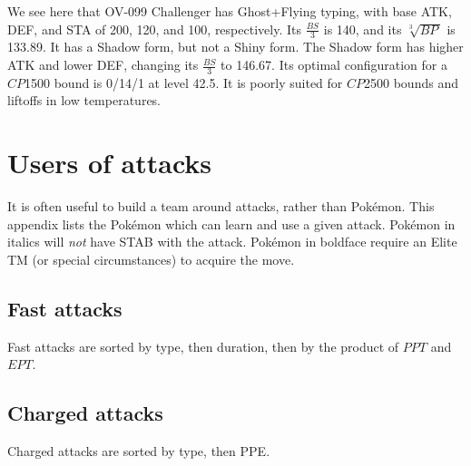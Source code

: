 \documentclass[ebook,10pt,openany,oneside]{memoir}
\newcommand*{\EPT}{\mbox{$\mathit{EPT}$}}
\newcommand*{\PPT}{\mbox{$\mathit{PPT}$}}
\newcommand*{\CP}{\mbox{$\mathit{CP}$}}
\newcommand*{\BP}{\mbox{$\mathit{BP}$}}
\begin{document}
\bigskip\noindent{}We see here that OV-099 Challenger has Ghost+Flying typing, with base ATK, DEF, and STA
of 200, 120, and 100, respectively. Its $\frac{BS}{3}$ is 140, and its $\sqrt[3]{\BP\,}$ is 133.89.
It has a Shadow form, but not a Shiny form. The Shadow form has higher ATK and lower DEF, changing
its $\frac{BS}{3}$ to 146.67. Its optimal configuration for a \CP1500 bound is 0/14/1 at level 42.5.
It is poorly suited for \CP2500 bounds and liftoffs in low temperatures.
\clearpage


\chapter{Users of attacks\label{chap:attackemployers}}
It is often useful to build a team around attacks, rather than Pokémon.
This appendix lists the Pokémon which can learn and use a given attack.
Pokémon in italics will \textit{not} have STAB with the attack.
Pokémon in boldface require an Elite TM (or special circumstances) to acquire the move.
\section{Fast attacks\label{sec:usersfast}}
Fast attacks are sorted by type, then duration, then by the product of \PPT{} and \EPT{}\@.

\section{Charged attacks\label{sec:userscharged}}
Charged attacks are sorted by type, then PPE\@.

\backmatter

\end{document}
